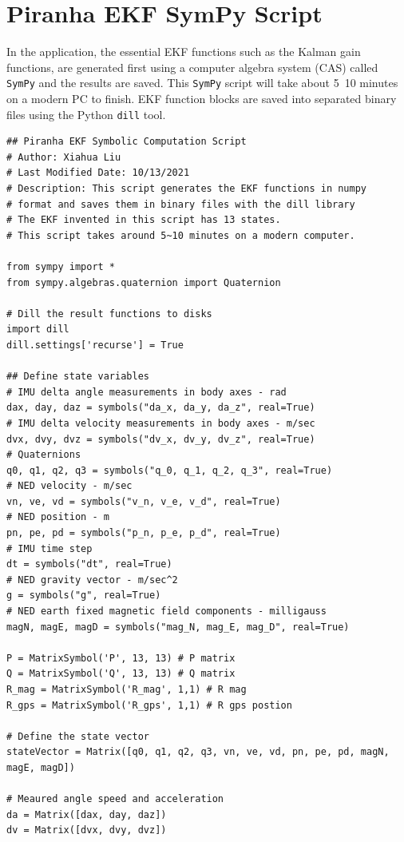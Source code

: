\label{app:ekf-sympy}
\chapter{Piranha EKF SymPy Script}

In the application, the essential EKF functions such as the Kalman gain functions, are generated first using a computer algebra system (CAS) called \lstinline|SymPy| and the results are saved. This \lstinline|SymPy| script will take about 5~10 minutes on a modern PC to finish. EKF function blocks are saved into separated binary files using the Python \lstinline|dill| tool.

\renewcommand{\baselinestretch}{1}\selectfont
\begin{lstlisting}
## Piranha EKF Symbolic Computation Script
# Author: Xiahua Liu
# Last Modified Date: 10/13/2021
# Description: This script generates the EKF functions in numpy
# format and saves them in binary files with the dill library
# The EKF invented in this script has 13 states.
# This script takes around 5~10 minutes on a modern computer.

from sympy import *
from sympy.algebras.quaternion import Quaternion

# Dill the result functions to disks
import dill
dill.settings['recurse'] = True

## Define state variables
# IMU delta angle measurements in body axes - rad
dax, day, daz = symbols("da_x, da_y, da_z", real=True)
# IMU delta velocity measurements in body axes - m/sec
dvx, dvy, dvz = symbols("dv_x, dv_y, dv_z", real=True)
# Quaternions
q0, q1, q2, q3 = symbols("q_0, q_1, q_2, q_3", real=True)
# NED velocity - m/sec
vn, ve, vd = symbols("v_n, v_e, v_d", real=True)   
# NED position - m
pn, pe, pd = symbols("p_n, p_e, p_d", real=True)  
# IMU time step 
dt = symbols("dt", real=True)    
# NED gravity vector - m/sec^2
g = symbols("g", real=True)    
# NED earth fixed magnetic field components - milligauss
magN, magE, magD = symbols("mag_N, mag_E, mag_D", real=True)    

P = MatrixSymbol('P', 13, 13) # P matrix
Q = MatrixSymbol('Q', 13, 13) # Q matrix
R_mag = MatrixSymbol('R_mag', 1,1) # R mag 
R_gps = MatrixSymbol('R_gps', 1,1) # R gps postion 

# Define the state vector
stateVector = Matrix([q0, q1, q2, q3, vn, ve, vd, pn, pe, pd, magN, magE, magD])

# Meaured angle speed and acceleration
da = Matrix([dax, day, daz])
dv = Matrix([dvx, dvy, dvz])


\end{lstlisting}
